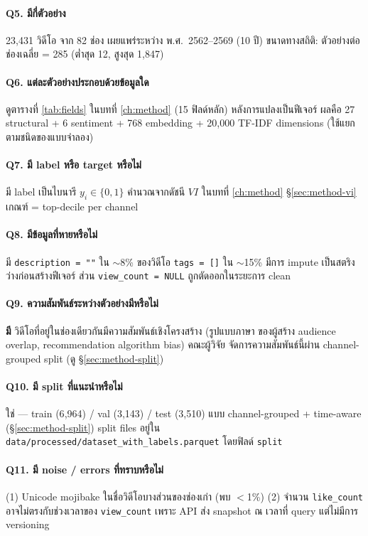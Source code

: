\paragraph{Q5. มีกี่ตัวอย่าง}
23{,}431 วิดีโอ จาก 82 ช่อง เผยแพร่ระหว่าง พ.ศ.\ 2562--2569 (10 ปี)
ขนาดทางสถิติ: ตัวอย่างต่อช่องเฉลี่ย = 285 (ต่ำสุด 12, สูงสุด 1{,}847)

\paragraph{Q6. แต่ละตัวอย่างประกอบด้วยข้อมูลใด}
ดูตารางที่ \ref{tab:fields} ในบทที่ \ref{ch:method} (15 ฟิลด์หลัก)
หลังการแปลงเป็นฟีเจอร์ ผลคือ 27 structural + 6 sentiment + 768 embedding
+ 20{,}000 TF-IDF dimensions (ใช้แยกตามชนิดของแบบจำลอง)

\paragraph{Q7. มี label หรือ target หรือไม่}
มี label เป็นไบนารี $y_i \in \{0, 1\}$ คำนวณจากดัชนี $\mathit{VI}$ ในบทที่
\ref{ch:method} \S\ref{sec:method-vi} เกณฑ์ = top-decile per channel

\paragraph{Q8. มีข้อมูลที่หายหรือไม่}
มี \texttt{description = ""} ใน $\sim$8\% ของวิดีโอ \texttt{tags = []} ใน
$\sim$15\% มีการ impute เป็นสตริงว่างก่อนสร้างฟีเจอร์ ส่วน \texttt{view\_count = NULL}
ถูกตัดออกในระยะการ clean

\paragraph{Q9. ความสัมพันธ์ระหว่างตัวอย่างมีหรือไม่}
\textbf{มี} วิดีโอที่อยู่ในช่องเดียวกันมีความสัมพันธ์เชิงโครงสร้าง (รูปแบบภาษา
ของผู้สร้าง audience overlap, recommendation algorithm bias) คณะผู้วิจัย
จัดการความสัมพันธ์นี้ผ่าน channel-grouped split (ดู \S\ref{sec:method-split})

\paragraph{Q10. มี split ที่แนะนำหรือไม่}
ใช่ — train (6{,}964) / val (3{,}143) / test (3{,}510) แบบ channel-grouped
+ time-aware (\S\ref{sec:method-split}) split files อยู่ใน
\texttt{data/processed/dataset\_with\_labels.parquet} โดยฟิลด์ \texttt{split}

\paragraph{Q11. มี noise / errors ที่ทราบหรือไม่}
(1) Unicode mojibake ในชื่อวิดีโอบางส่วนของช่องเก่า (พบ $<$1\%) (2) จำนวน
\texttt{like\_count} อาจไม่ตรงกับช่วงเวลาของ \texttt{view\_count} เพราะ API
ส่ง snapshot ณ เวลาที่ query แต่ไม่มีการ versioning

